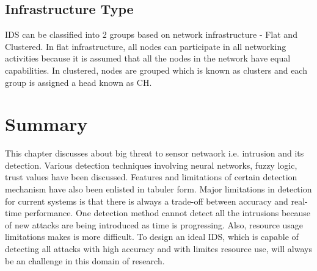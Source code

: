 \subsection{Infrastructure Type}
IDS can be classified into 2 groups based on network infrastructure - Flat and Clustered. In flat infrastructure, all nodes can participate in all networking activities because it is assumed that all the nodes in the network have equal capabilities. In clustered, nodes are grouped which is known as clusters and each group is assigned a head known as CH.

\section{Summary}
This chapter discusses about big threat to sensor netwaork i.e. intrusion and its detection. Various detection techniques involving neural networks, fuzzy logic, trust values have been discussed. Features and limitations of certain detection mechanism have also been enlisted in tabuler form. Major limitations in detection for current systems is that there is always a trade-off between accuracy and real-time performance. One detection method cannot detect all the intrusions because of new attacks are being introduced as time is progressing. Also, resource usage limitations makes is more difficult. To design an ideal IDS, which is capable of detecting all attacks with high accuracy and with limites resource use, will always be an challenge in this domain of research.